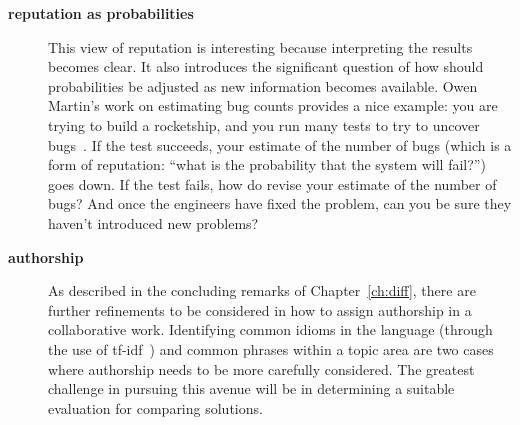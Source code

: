 \begin{description}
\item[\textbf{reputation as probabilities}]  This view of reputation is
    interesting because interpreting the results becomes clear.
    It also introduces the significant question of how should probabilities
    be adjusted as new information becomes available.
    Owen Martin's work on estimating bug counts provides a nice example:
    you are trying to build a rocketship, and you run many
    tests to try to uncover bugs~\cite{Martin2011}.
    If the test succeeds, your estimate
    of the number of bugs (which is a form of reputation: ``what is
    the probability that the system will fail?'') goes down.
    If the test fails, how do revise your estimate of the number
    of bugs?  And once the engineers have fixed the problem, can
    you be sure they haven't introduced new problems?

\item[\textbf{authorship}]  As described in the concluding remarks of
    Chapter~\ref{ch:diff}, there are further refinements to be
    considered in how to assign authorship in a collaborative work.
    Identifying common idioms in the language (\eg through the use of
    tf-idf~\cite{Jones1972}) and common phrases within a topic area
    are two cases where authorship needs to be more carefully considered.
    The greatest challenge in pursuing this avenue will be in
    determining a suitable evaluation for comparing solutions.

\end{description}


